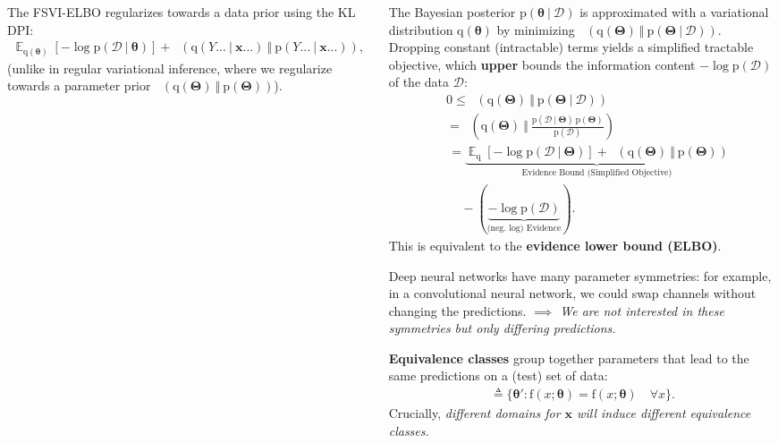 \documentclass[25pt,a0paper,landscape]{tikzposter}
\DeclareMathOperator{\opExpectation}{\mathbb{E}}
\newcommand{\E}[2]{\opExpectation_{#1} \left [ #2 \right ]}
\newcommand{\MidSymbol}[1][]{\:#1\:}
\newcommand{\given}{\MidSymbol[\vert]}
\DeclareMathOperator{\opKale}{D_\mathrm{KL}}
\newcommand{\Kale}[2]{\opKale(#1 \MidSymbol[\Vert] #2)}
\newcommand{\opp}{\mathrm{p}}
\newcommand{\pof}[1]{\opp(#1)}
\newcommand{\opq}{\mathrm{q}}
\newcommand{\qof}[1]{\opq(#1)}
\newcommand{\w}{\boldsymbol{\theta}}
\newcommand{\W}{\boldsymbol{\Theta}}
\newcommand{\opf}{\mathrm{f}}
\newcommand{\fof}[1]{\opf(#1)}
\newcommand{\Dany}{\mathcal{D}}
\newcommand{\Y}{Y}
\newcommand{\x}{\boldsymbol{x}}
\begin{document}
\begin{columns}
{\begin{tldrbox}
    The FSVI-ELBO regularizes towards a data prior using the KL DPI:
    \begin{align*}
    \E{\qof{\w}}{-\log \pof{\Dany \given \w}} + \Kale{\qof{\Y... \given \x...}}{\pof{\Y... \given \x...}},
    \end{align*}
    (unlike in regular variational inference, where we regularize towards a parameter prior $\Kale{\qof{\W}}{\pof{\W}}$).
  \end{tldrbox}
  \begin{multicols}{2}
    \begin{backgroundbox}[title=(Regular) Variational Inference \& ELBO]
      The Bayesian posterior $\pof{\w \given \Dany}$ is approximated with a variational distribution $\qof{\w}$ by minimizing $\Kale{\qof{\W}}{\pof{\W \given \Dany}}$. Dropping constant (intractable) terms yields a simplified tractable objective, which \textbf{upper} bounds the information content $-\log \pof{\Dany}$ of the data $\Dany$:
      \begin{align*}
      & 0 \le \Kale{\qof{\W}}{\pof{\W \given \Dany}} \\
      &= \Kale{\qof{\W}}{\frac{\pof{\Dany \given \W}\,\pof{\W}}{\pof{\Dany}}}\\
      &\, = \underbrace{\E{\opq}{-\log \pof{\Dany \given \W}} + \Kale{\qof{\W}}{\pof{\W}}}_{\text{Evidence Bound (Simplified Objective)}} \\
      &\, \quad - (\underbrace{-\log \pof{\Dany}}_{\text{(neg.~log) Evidence}}).
      \end{align*}
      This is equivalent to the \textbf{evidence lower bound (ELBO)}.
    \end{backgroundbox}
    \begin{theorybox}[title=Parameter Symmetries]
      Deep neural networks have many parameter symmetries: for example, in a convolutional neural network, we could swap channels without changing the predictions.
      \emph{$\implies$ We are not interested in these symmetries but only differing predictions.}
    \end{theorybox}
    \begin{theorybox}[title=Equivalence Classes]
      \textbf{Equivalence classes} group together parameters that lead to the same predictions on a (test) set of data:
      \begin{align*}
        [\w] \triangleq \{\w' : \fof{x ; \w} = \fof{x ; \w} \quad \forall x \}.
      \end{align*}
      Crucially, \emph{different domains for $\x$ will induce different equivalence classes.}

\end{theorybox}
\end{multicols}}
\end{columns}
\end{document}

